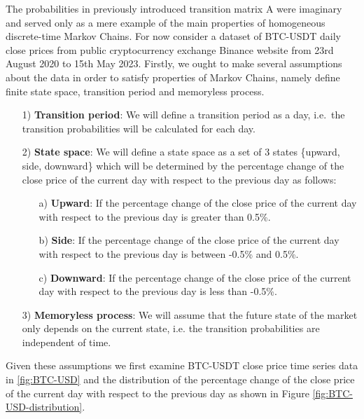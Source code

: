 The probabilities in previously introduced transition matrix A were imaginary and served only as a mere example of the main properties of homogeneous discrete-time Markov Chains. 
For now consider a dataset of BTC-USDT daily close prices from public cryptocurrency exchange Binance website from 23rd August 2020 to 15th May 2023. 
Firstly, we ought to make several assumptions about the data in order to satisfy properties of Markov Chains, namely define finite state space, transition period and memoryless process. 

\begin{itemize}
\item [1)] \textbf{Transition period}: We will define a transition period as a day, i.e.\ the transition probabilities will be calculated for each day.
\item [2)] \textbf{State space}: We will define a state space as a set of 3 states \{upward, side, downward\} which will be determined by the percentage change of the close price of the current day with respect to the previous day as follows:
    \begin{itemize}
    \item [a)] \textbf{Upward}: If the percentage change of the close price of the current day with respect to the previous day is greater than 0.5\%.
    \item [b)] \textbf{Side}: If the percentage change of the close price of the current day with respect to the previous day is between -0.5\% and 0.5\%.
    \item [c)] \textbf{Downward}: If the percentage change of the close price of the current day with respect to the previous day is less than -0.5\%.
    \end{itemize}
\item [3)] \textbf{Memoryless process}: We will assume that the future state of the market only depends on the current state, i.e. the transition probabilities are independent of time.
\end{itemize}

Given these assumptions we first examine BTC-USDT close price time series data in \ref{fig:BTC-USD} and the distribution of the percentage change of the close price of the current day with respect to the previous day as shown in Figure \ref{fig:BTC-USD-distribution}.

